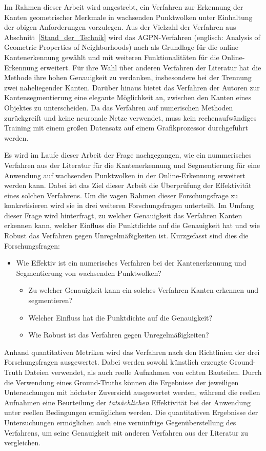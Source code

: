 Im Rahmen dieser Arbeit wird angestrebt, ein Verfahren zur Erkennung der Kanten geometrischer Merkmale in wachsenden Punktwolken unter Einhaltung der obigen Anforderungen vorzulegen. Aus der Vielzahl der Verfahren aus Abschnitt~\ref{Stand_der_Technik} wird das AGPN-Verfahren (englisch: Analysis of Geometric Properties of Neighborhoods) nach \textcite{ni_edge_2016} als Grundlage für die online Kantenerkennung gewählt und mit weiteren Funktionalitäten für die Online-Erkennung erweitert. Für ihre Wahl über anderen Verfahren der Literatur hat die Methode ihre hohen Genauigkeit zu verdanken, insbesondere bei der Trennung zwei naheliegender Kanten. Darüber hinaus bietet das Verfahren der Autoren zur Kantensegmentierung eine elegante Möglichkeit an, zwischen den Kanten eines Objektes zu unterscheiden. Da das Verfahren auf numerischen Methoden zurückgreift und keine neuronale Netze verwendet, muss kein rechenaufwändiges Training mit einem großen Datensatz auf einem Grafikprozessor durchgeführt werden.  

Es wird im Laufe dieser Arbeit der Frage nachgegangen, wie ein nummerisches Verfahren aus der Literatur für die Kantenerkennung und Segmentierung für eine Anwendung auf wachsenden Punktwolken in der Online-Erkennung erweitert werden kann. Dabei ist das Ziel dieser Arbeit die Überprüfung der Effektivität eines solchen Verfahrens. Um die vagen Rahmen dieser Forschungsfrage zu konkretisieren wird sie in drei weiteren Forschungsfragen unterteilt. Im Umfang dieser Frage wird hinterfragt, zu welcher Genauigkeit das Verfahren Kanten erkennen kann, welcher Einfluss die Punktdichte auf die Genauigkeit hat und wie Robust das Verfahren gegen Unregelmäßigkeiten ist. Kurzgefasst sind dies die Forschungsfragen:

\begin{itemize}
	\item Wie Effektiv ist ein numerisches Verfahren bei der Kantenerkennung und Segmentierung von wachsenden Punktwolken?
	\begin{itemize}
		\item Zu welcher Genauigkeit kann ein solches Verfahren Kanten erkennen und segmentieren?
		\item Welcher Einfluss hat die Punktdichte auf die Genauigkeit?
		\item Wie Robust ist das Verfahren gegen Unregelmäßigkeiten?
	\end{itemize}
\end{itemize}

Anhand quantitativen Metriken wird das Verfahren nach den Richtlinien der drei Forschungsfragen ausgewertet. Dabei werden sowohl künstlich erzeugte Ground-Truth Dateien verwendet, als auch reelle Aufnahmen von echten Bauteilen. Durch die Verwendung eines Ground-Truths können die Ergebnisse der jeweiligen Untersuchungen mit höchster Zuversicht ausgewertet werden, während die reellen Aufnahmen eine Beurteilung der \textit{tatsächlichen} Effektivität bei der Anwendung unter reellen Bedingungen ermöglichen werden. Die quantitativen Ergebnisse der Untersuchungen ermöglichen auch eine vernünftige Gegenüberstellung des Verfahrens, um seine Genauigkeit mit anderen Verfahren aus der Literatur zu vergleichen. 

